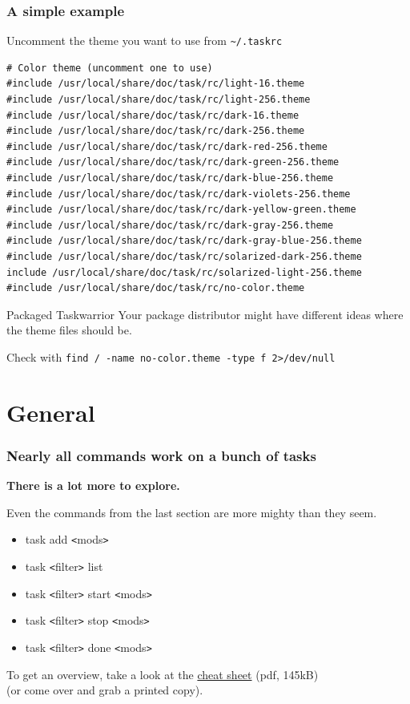 \documentclass[t,handout]{beamer}
\begin{document}
\begin{frame}[fragile]\frametitle{A simple example}
    Uncomment the theme you want to use from \verb+~/.taskrc+
    \begin{lstlisting}
# Color theme (uncomment one to use)
#include /usr/local/share/doc/task/rc/light-16.theme
#include /usr/local/share/doc/task/rc/light-256.theme
#include /usr/local/share/doc/task/rc/dark-16.theme
#include /usr/local/share/doc/task/rc/dark-256.theme
#include /usr/local/share/doc/task/rc/dark-red-256.theme
#include /usr/local/share/doc/task/rc/dark-green-256.theme
#include /usr/local/share/doc/task/rc/dark-blue-256.theme
#include /usr/local/share/doc/task/rc/dark-violets-256.theme
#include /usr/local/share/doc/task/rc/dark-yellow-green.theme
#include /usr/local/share/doc/task/rc/dark-gray-256.theme
#include /usr/local/share/doc/task/rc/dark-gray-blue-256.theme
#include /usr/local/share/doc/task/rc/solarized-dark-256.theme
include /usr/local/share/doc/task/rc/solarized-light-256.theme
#include /usr/local/share/doc/task/rc/no-color.theme
\end{lstlisting}

    \begin{alertblock}{Packaged Taskwarrior}
        Your package distributor might have different ideas where the theme files should be.

        Check with \verb+find / -name no-color.theme -type f 2>/dev/null+
    \end{alertblock}
\end{frame}

\section{General}

\begin{frame}[fragile]\frametitle{Nearly all commands work on a bunch of tasks}
    \textbf{There is a lot more to explore.}

    Even the commands from the last section are more mighty than they seem. \pause

    \begin{itemize}
        \item task add {\tt<}mods{\tt>}
        \item task {\tt<}filter{\tt>} list
        \item task {\tt<}filter{\tt>} start {\tt<}mods{\tt>}
        \item task {\tt<}filter{\tt>} stop {\tt<}mods{\tt>}
        \item task {\tt<}filter{\tt>} done {\tt<}mods{\tt>}
    \end{itemize} \pause

    To get an overview, take a look at the \href{http://taskwarrior.org/download/task-2.5.1.ref.pdf}{cheat sheet} (pdf, 145kB) \\
    (or come over and grab a printed copy).
\end{frame}
\end{document}

